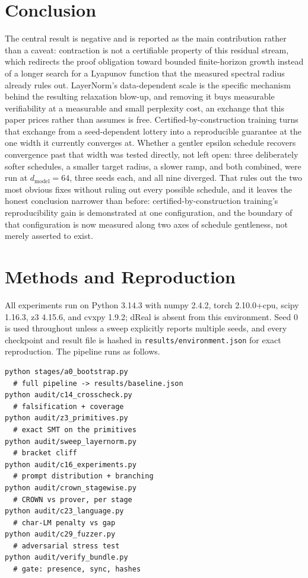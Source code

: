 \documentclass[10pt,journal]{IEEEtran}
\begin{document}
\section{Conclusion}
The central result is negative and is reported as the main contribution rather than a caveat: contraction is not a certifiable property of this residual stream, which redirects the proof obligation toward bounded finite-horizon growth instead of a longer search for a Lyapunov function that the measured spectral radius already rules out. LayerNorm's data-dependent scale is the specific mechanism behind the resulting relaxation blow-up, and removing it buys measurable verifiability at a measurable and small perplexity cost, an exchange that this paper prices rather than assumes is free. Certified-by-construction training turns that exchange from a seed-dependent lottery into a reproducible guarantee at the one width it currently converges at. Whether a gentler epsilon schedule recovers convergence past that width was tested directly, not left open: three deliberately softer schedules, a smaller target radius, a slower ramp, and both combined, were run at $d_{\text{model}}=64$, three seeds each, and all nine diverged. That rules out the two most obvious fixes without ruling out every possible schedule, and it leaves the honest conclusion narrower than before: certified-by-construction training's reproducibility gain is demonstrated at one configuration, and the boundary of that configuration is now measured along two axes of schedule gentleness, not merely asserted to exist.

\appendix
\section{Methods and Reproduction}
All experiments run on Python 3.14.3 with numpy 2.4.2, torch 2.10.0+cpu, scipy 1.16.3, z3 4.15.6, and cvxpy 1.9.2; dReal is absent from this environment. Seed 0 is used throughout unless a sweep explicitly reports multiple seeds, and every checkpoint and result file is hashed in \texttt{results/environment.json} for exact reproduction. The pipeline runs as follows.
\begin{verbatim}
python stages/a0_bootstrap.py
  # full pipeline -> results/baseline.json
python audit/c14_crosscheck.py
  # falsification + coverage
python audit/z3_primitives.py
  # exact SMT on the primitives
python audit/sweep_layernorm.py
  # bracket cliff
python audit/c16_experiments.py
  # prompt distribution + branching
python audit/crown_stagewise.py
  # CROWN vs prover, per stage
python audit/c23_language.py
  # char-LM penalty vs gap
python audit/c29_fuzzer.py
  # adversarial stress test
python audit/verify_bundle.py
  # gate: presence, sync, hashes
\end{verbatim}
\end{document}
